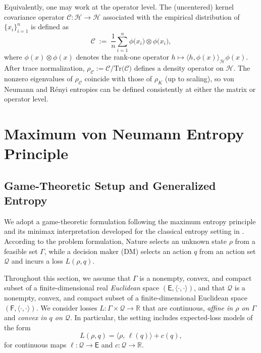 \documentclass{article}
\theoremstyle{plain}
\theoremstyle{definition}
\begin{document}
Equivalently, one may work at the operator level. The (uncentered) kernel
covariance operator $\mathcal{C}:\mathcal{H}\to\mathcal{H}$ associated with the
empirical distribution of $\{x_i\}_{i=1}^n$ is defined as
\begin{equation}
\mathcal{C}
\;:=\;
\frac{1}{n}\sum_{i=1}^n \phi\bigl(x_i\bigr)\otimes \phi\bigl(x_i\bigr),
\label{eq:kernel-cov-operator}
\end{equation}
where $\phi(x)\otimes\phi(x)$ denotes the rank-one operator
$h\mapsto \langle h,\phi(x)\rangle_{\mathcal{H}}\phi(x)$.
After trace normalization,
$\rho_{\mathcal{C}}:=\mathcal{C}/\mathrm{Tr}\bigl(\mathcal{C}\bigr)$
defines a density operator on $\mathcal{H}$.
The nonzero eigenvalues of $\rho_{\mathcal{C}}$ coincide with those of
$\rho_K$ (up to scaling), so von Neumann and R\'enyi entropies can be defined
consistently at either the matrix or operator level.

\section{Maximum von Neumann Entropy Principle}
\label{sec:maxvne}

\subsection{Game-Theoretic Setup and Generalized Entropy}
\label{subsec:setup}

We adopt a game-theoretic formulation following the maximum entropy principle  and its minimax interpretation developed for the classical entropy setting in \cite{GrunwaldDawid2004}. According to the problem formulation, 
Nature selects an unknown state $\rho$ from a feasible set $\Gamma$, while a
decision maker (DM) selects an action $q$ from an action set $\mathcal{Q}$ and
incurs a loss $L(\rho,q)$.

Throughout this section, we assume that $\Gamma$ is a nonempty, convex, and
compact subset of a finite-dimensional real \emph{Euclidean} space $(\mathsf{E},\langle\cdot,\cdot\rangle)$,
and that $\mathcal{Q}$ is a nonempty, convex, and compact subset of a
finite-dimensional Euclidean space $(\mathsf{F},\langle\cdot,\cdot\rangle)$.
We consider losses $L:\Gamma\times\mathcal{Q}\to\mathbb{R}$ that are continuous,
\emph{affine in $\rho$ on $\Gamma$} and \emph{convex in $q$ on $\mathcal{Q}$}.
In particular, the setting includes expected-loss models of the form
\begin{equation}
L(\rho,q)
=
\bigl\langle \rho,\, \ell(q)\bigr\rangle + c(q),
\label{eq:expected-loss-form}
\end{equation}
for continuous maps $\ell:\mathcal{Q}\to\mathsf{E}$ and $c:\mathcal{Q}\to\mathbb{R}$.
\end{document}
